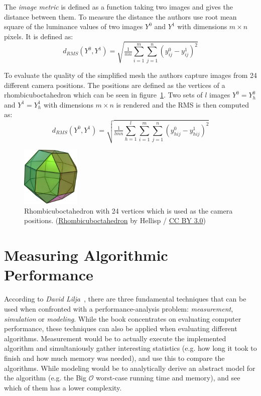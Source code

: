 The \emph{image metric} is defined as a function taking two images and gives the distance between them. To measure the distance the authors use root mean square of the luminance values of two images $Y^0$ and $Y^1$ with dimensions $m \times n$ pixels. It is defined as:
\begin{equation} \label{eq:rms_images}
  d_{RMS}(Y^0,Y^1) = \sqrt{\tfrac{1}{mn}\sum^m_{i=1}\sum^n_{j=1}(y^0_{ij} - y^1_{ij})^2}
\end{equation}

To evaluate the quality of the simplified mesh the authors capture images from 24 different camera positions. The positions are defined as the vertices of a rhombicuboctahedron which can be seen in figure~\ref{fig:rhombicuboctahedron}. Two sets of $l$ images $Y^0 = {Y^0_h}$ and $Y^1 = {Y^1_h}$ with dimensions $m \times n$ is rendered and the RMS is then computed as:
\begin{equation}  \label{eq:rms_image_sets}
  d_{RMS}(Y^0,Y^1) = \sqrt{\tfrac{1}{lmn}\sum^l_{h=1}\sum^m_{i=1}\sum^n_{j=1}(y^0_{hij} - y^1_{hij})^2}
\end{equation}

\begin{figure}[h]
    \centering
    \includegraphics[width=0.25\textwidth]{figures/591px-Rhombicuboctahedron.jpg}
    \caption{Rhombicuboctahedron with 24 vertices which is used as the camera positions. 
      (\href{https://commons.wikimedia.org/wiki/File:Rhombicuboctahedron.jpg}{Rhombicuboctahedron} by Hellisp / \href{https://creativecommons.org/licenses/by/3.0/}{CC BY 3.0})}
    \label{fig:rhombicuboctahedron}
\end{figure}

\section{Measuring Algorithmic Performance} \label{sec:measuring_algorithmic_performance}

According to \emph{David Lilja}~\cite[p.~4]{lilja2005measuring}, there are three fundamental techniques that can be used when confronted with a performance-analysis problem: \emph{measurement}, \emph{simulation} or \emph{modeling}. While the book concentrates on evaluating computer performance, these techniques can also be applied when evaluating different algorithms. Measurement would be to actually execute the implemented algorithm and simultaniously gather interesting statistics (e.g. how long it took to finish and how much memory was needed), and use this to compare the algorithms. While modeling would be to analytically derive an abstract model for the algorithm (e.g. the Big \(\mathcal{O}\) worst-case running time and memory), and see which of them has a lower complexity.

